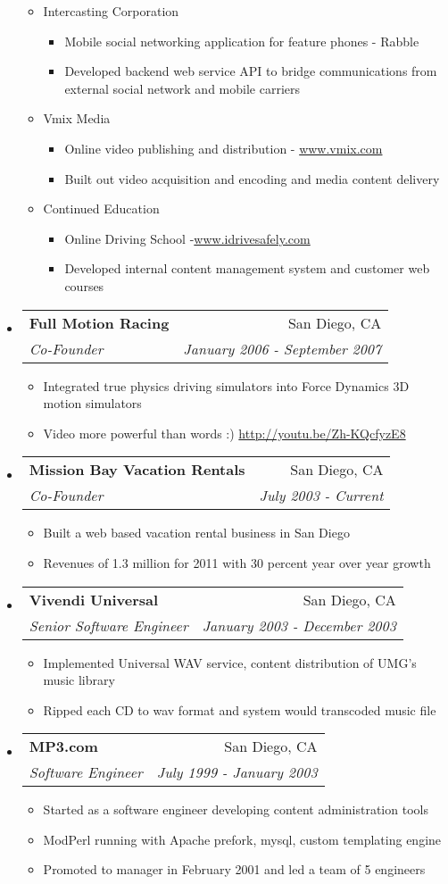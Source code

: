 \documentclass[letterpaper,11pt]{article}
\makeatletter
\newcommand{\resitem}[1]{\item #1 \vspace{-2pt}}
\newcommand{\ressubheading}[4]{
  \begin{tabular*}{7.0in}{l@{\extracolsep{\fill}}r}
    \textbf{#1} & #2 \\
    \textit{#3} & \textit{#4} \\
  \end{tabular*}\vspace{-6pt}}
\makeatother
\begin{document}
\begin{itemize}
\begin{itemize}
    \resitem{Intercasting Corporation}
    \begin{itemize}
      \resitem{Mobile social networking application for feature phones - Rabble}
      \resitem{Developed backend web service API to bridge communications from external social network and mobile carriers}
    \end{itemize}
    \resitem{Vmix Media}
    \begin{itemize}
      \resitem{Online video publishing and distribution - \url{www.vmix.com} }
      \resitem{Built out video acquisition and encoding and media content delivery}
    \end{itemize}
    \resitem{Continued Education}
    \begin{itemize}
      \resitem{Online Driving School -\url{www.idrivesafely.com} }
      \resitem{Developed internal content management system and customer web courses }
    \end{itemize}
  \end{itemize}
\item
  \ressubheading{Full Motion Racing}{San Diego, CA}{Co-Founder}{January 2006 - September 2007 }
  \begin{itemize}
    \resitem{Integrated true physics driving simulators into Force Dynamics 3D motion simulators}
    \resitem{Video more powerful than words :) \url{http://youtu.be/Zh-KQcfyzE8} }
  \end{itemize}
\item
  \ressubheading{Mission Bay Vacation Rentals}{San Diego, CA}{Co-Founder}{July 2003 - Current }
  \begin{itemize}
    \resitem{Built a web based vacation rental business in San Diego}
    \resitem{Revenues of 1.3 million for 2011 with 30 percent year over year growth}
  \end{itemize}
\item
  \ressubheading{Vivendi Universal}{San Diego, CA}{Senior Software Engineer}{January 2003 - December 2003}
  \begin{itemize}
    \resitem{Implemented Universal WAV service, content distribution of UMG's music library}
    \resitem{Ripped each CD to wav format and system would transcoded music file }
  \end{itemize}
\item
  \ressubheading{MP3.com}{San Diego, CA}{Software Engineer}{July 1999 - January 2003}
  \begin{itemize}
    \resitem{Started as a software engineer developing content administration tools}
    \resitem{ModPerl running with Apache prefork, mysql, custom templating engine}
    \resitem{Promoted to manager in February 2001 and led a team of 5 engineers}
  \end{itemize}
\end{itemize}
\end{document}

